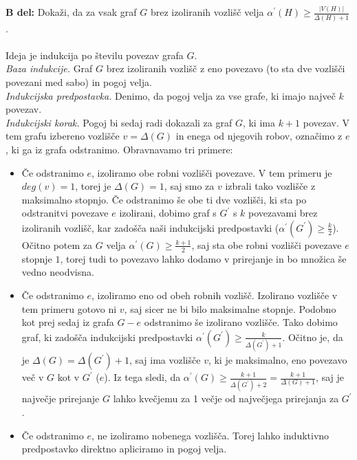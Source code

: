 \documentclass[a4paper,11pt]{article}
\begin{document}



\noindent
\textbf{B del:}
Dokaži, da za vsak graf $G$ brez izoliranih vozlišč velja $\alpha^{'}(H) \geq \frac{|V(H)|}{\Delta (H) + 1}$.
\\
\\
Ideja je indukcija po številu povezav grafa $G$.
\\
\textit{Baza indukcije.} Graf $G$ brez izoliranih vozlišč z eno povezavo (to sta dve vozlišči povezani med sabo) in pogoj velja.
\\
\textit{Indukcijska predpostavka.} Denimo, da pogoj velja za vse grafe, ki imajo največ $k$ povezav.
\\
\textit{Indukcijski korak.} Pogoj bi sedaj radi dokazali za graf $G$, ki ima $k + 1$ povezav. V tem grafu izbereno vozlišče $v = \Delta(G)$ in enega od njegovih robov, označimo z $e$, ki ga iz grafa odstranimo.
Obravnavamo tri primere:
\begin{itemize}
    \item Če odstranimo $e$, izoliramo obe robni vozlišči povezave. V tem primeru je $deg(v) = 1$, torej je $\Delta(G) = 1$, saj smo za $v$ izbrali tako vozlišče z maksimalno stopnjo.
        Če odstranimo še obe ti dve vozlišči, ki sta po odstranitvi povezave $e$ izolirani, dobimo graf s $G^{'}$ s $k$ povezavami brez izoliranih vozlišč, kar zadošča naši indukcijski predpostavki ($\alpha^{'} (G^{'}) \geq \frac{k}{2}$).
        Očitno potem za $G$ velja $\alpha^{'} (G) \geq \frac{k + 1}{2}$, saj sta obe robni vozlišči povezave $e$ stopnje $1$, torej tudi to povezavo lahko dodamo v prirejanje in bo množica še vedno neodvisna.
    \item Če odstranimo $e$, izoliramo eno od obeh robnih vozlišč. Izolirano vozlišče v tem primeru gotovo ni $v$, saj sicer ne bi bilo maksimalne stopnje. Podobno kot prej sedaj iz grafa $G - e$ odstranimo še izolirano vozlišče. Tako dobimo graf, ki zadošča indukcijski predpostavki $\alpha^{'} (G^{'}) \geq \frac{k}{\Delta(G^{'}) + 1}$.
        Očitno je, da je $\Delta(G) = \Delta(G^{'}) + 1$, saj ima vozlišče $v$, ki je maksimalno, eno povezavo več v $G$ kot v $G^{'}$ ($e$). Iz tega sledi, da $\alpha^{'} (G) \geq \frac{k + 1}{\Delta(G^{'}) + 2} = \frac{k + 1}{\Delta(G) + 1}$, saj je največje prirejanje $G$ lahko kvečjemu za 1 večje od največjega prirejanja za $G^{'}$.
    \item Če odstranimo $e$, ne izoliramo nobenega vozlišča. Torej lahko induktivno predpostavko direktno apliciramo in pogoj velja.
\end{itemize}
\newpage
\end{document}
